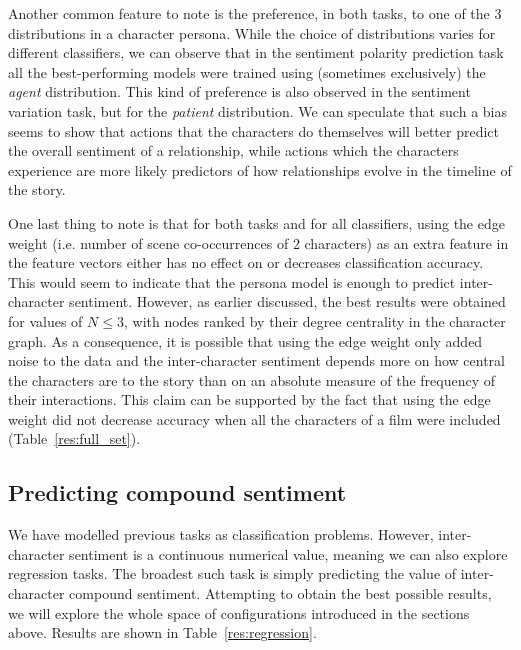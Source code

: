 \documentclass[bsc,frontabs,singlespacing,parskip]{infthesis} %
\begin{document}
Another common feature to note is the preference, in both tasks, to one of the 3 distributions in a character persona. While the choice of distributions varies for different classifiers, we can observe that in the sentiment polarity prediction task all the best-performing models were trained using (sometimes exclusively) the \textit{agent} distribution. This kind of preference is also observed in the sentiment variation task, but for the \textit{patient} distribution. We can speculate that such a bias seems to show that actions that the characters do themselves will better predict the overall sentiment of a relationship, while actions which the characters experience are more likely predictors of how relationships evolve in the timeline of the story.

One last thing to note is that for both tasks and for all classifiers, using the edge weight (i.e. number of scene co-occurrences of 2 characters) as an extra feature in the feature vectors either has no effect on or decreases classification accuracy. This would seem to indicate that the persona model is enough to predict inter-character sentiment. However, as earlier discussed, the best results were obtained for values of $N \le 3$, with nodes ranked by their degree centrality in the character graph. As a consequence, it is possible that using the edge weight only added noise to the data and the inter-character sentiment depends more on how central the characters are to the story than on an absolute measure of the frequency of their interactions. This claim can be supported by the fact that using the edge weight did not decrease accuracy when all the characters of a film were included (Table~\ref{res:full_set}).

\subsection{Predicting compound sentiment}
We have modelled previous tasks as classification problems. However, inter-character sentiment is a continuous numerical value, meaning we can also explore regression tasks. The broadest such task is simply predicting the value of inter-character compound sentiment. Attempting to obtain the best possible results, we will explore the whole space of configurations introduced in the sections above. Results are shown in Table~\ref{res:regression}. 
\end{document}
